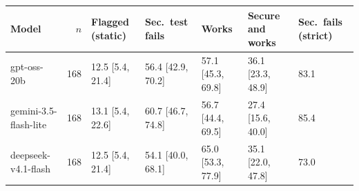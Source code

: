 \begin{tabular}{lrlllll}
\toprule
Model & $n$ & Flagged (static) & Sec.\ test fails & Works & Secure and works & Sec.\ fails (strict) \\
\midrule
gpt-oss-20b & 168 & 12.5 [5.4, 21.4] & 56.4 [42.9, 70.2] & 57.1 [45.3, 69.8] & 36.1 [23.3, 48.9] & 83.1 \\
gemini-3.5-flash-lite & 168 & 13.1 [5.4, 22.6] & 60.7 [46.7, 74.8] & 56.7 [44.4, 69.5] & 27.4 [15.6, 40.0] & 85.4 \\
deepseek-v4.1-flash & 168 & 12.5 [5.4, 21.4] & 54.1 [40.0, 68.1] & 65.0 [53.3, 77.9] & 35.1 [22.0, 47.8] & 73.0 \\
\bottomrule
\end{tabular}
